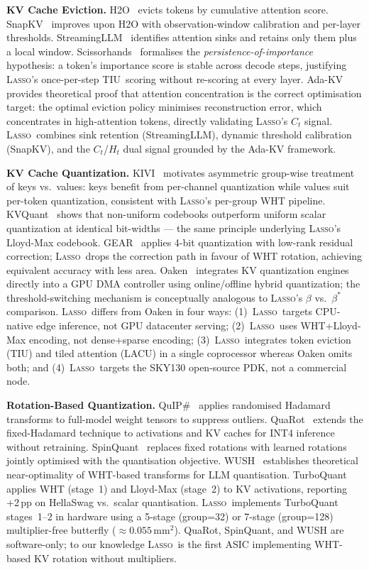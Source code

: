 \documentclass[conference]{IEEEtran}
\newcommand{\lasso}{\textsc{Lasso}}
\newcommand{\tiu}{\textsc{TIU}}
\newcommand{\lacu}{\textsc{LACU}}
\begin{document}
\textbf{KV Cache Eviction.}
H2O~\cite{h2o2023} evicts tokens by cumulative attention score.
SnapKV~\cite{snapkv2024} improves upon H2O with observation-window
calibration and per-layer thresholds. StreamingLLM~\cite{streamingllm2023}
identifies attention sinks and retains only them plus a local window.
Scissorhands~\cite{scissorhands2023} formalises the
\emph{persistence-of-importance} hypothesis: a token's importance
score is stable across decode steps, justifying \lasso's once-per-step
\tiu\ scoring without re-scoring at every layer. Ada-KV~\cite{adakv2024}
provides theoretical proof that attention concentration is the correct
optimisation target: the optimal eviction policy minimises reconstruction
error, which concentrates in high-attention tokens, directly validating
\lasso's $C_t$ signal. \lasso\ combines sink retention (StreamingLLM),
dynamic threshold calibration (SnapKV), and the $C_t$/$H_t$ dual signal
grounded by the Ada-KV framework.

\textbf{KV Cache Quantization.}
KIVI~\cite{kivi2024} motivates asymmetric group-wise treatment of keys
vs.\ values: keys benefit from per-channel quantization while values
suit per-token quantization, consistent with \lasso's per-group WHT
pipeline. KVQuant~\cite{kvquant2024} shows that non-uniform codebooks
outperform uniform scalar quantization at identical bit-widths ---
the same principle underlying \lasso's Lloyd-Max codebook.
GEAR~\cite{gear2024} applies 4-bit quantization with low-rank residual
correction; \lasso\ drops the correction path in favour of WHT rotation,
achieving equivalent accuracy with less area. Oaken~\cite{oaken2025}
integrates KV quantization engines directly into a GPU DMA controller
using online/offline hybrid quantization; the threshold-switching
mechanism is conceptually analogous to \lasso's $\beta$ vs.\ $\beta^*$
comparison. \lasso\ differs from Oaken in four ways: (1)~\lasso\
targets CPU-native edge inference, not GPU datacenter serving;
(2)~\lasso\ uses WHT+Lloyd-Max encoding, not dense+sparse encoding;
(3)~\lasso\ integrates token eviction (\tiu) and tiled attention
(\lacu) in a single coprocessor whereas Oaken omits both; and
(4)~\lasso\ targets the SKY130 open-source PDK, not a commercial node.

\textbf{Rotation-Based Quantization.}
QuIP\#~\cite{quip2024} applies randomised Hadamard transforms to full-model
weight tensors to suppress outliers. QuaRot~\cite{quarot2024} extends
the fixed-Hadamard technique to activations and KV caches for INT4
inference without retraining. SpinQuant~\cite{spinquant2025} replaces
fixed rotations with learned rotations jointly optimised with the
quantisation objective. WUSH~\cite{wush2025} establishes theoretical
near-optimality of WHT-based transforms for LLM quantisation.
TurboQuant~\cite{turboquant2026} applies WHT (stage~1) and Lloyd-Max
(stage~2) to KV activations, reporting +2\,pp on HellaSwag vs.\ scalar
quantisation. \lasso\ implements TurboQuant stages~1--2 in hardware using
a 5-stage (group=32) or 7-stage (group=128) multiplier-free butterfly
(${\approx}0.055\,\text{mm}^2$). QuaRot, SpinQuant, and WUSH are
software-only; to our knowledge \lasso\ is the first ASIC implementing
WHT-based KV rotation without multipliers.
\end{document}
